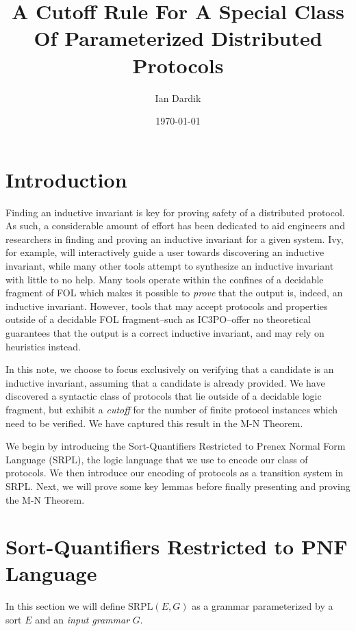 \documentclass[12pt]{article}
\title{A Cutoff Rule For A Special Class Of Parameterized Distributed Protocols}
\author{Ian Dardik}
\date{\today}
\theoremstyle{definition}
\theoremstyle{remark}
\newcommand{\SRPL}{\text{SRPL}}
\begin{document}
\maketitle

\section{Introduction}
Finding an inductive invariant is key for proving safety of a distributed protocol.  As such, a considerable amount of effort has been dedicated to aid engineers and researchers in finding and proving an inductive invariant for a given system.  Ivy, for example, will interactively guide a user towards discovering an inductive invariant, while many other tools attempt to synthesize an inductive invariant with little to no help.  Many tools operate within the confines of a decidable fragment of FOL which makes it possible to \textit{prove} that the output is, indeed, an inductive invariant.  However, tools that may accept protocols and properties outside of a decidable FOL fragment--such as IC3PO--offer no theoretical guarantees that the output is a correct inductive invariant, and may rely on heuristics instead.

In this note, we choose to focus exclusively on verifying that a candidate is an inductive invariant, assuming that a candidate is already provided.  We have discovered a syntactic class of protocols that lie outside of a decidable logic fragment, but exhibit a \textit{cutoff} for the number of finite protocol instances which need to be verified.  We have captured this result in the M-N Theorem.

We begin by introducing the Sort-Quantifiers Restricted to Prenex Normal Form Language (SRPL), the logic language that we use to encode our class of protocols.  We then introduce our encoding of protocols as a transition system in SRPL.  Next, we will prove some key lemmas before finally presenting and proving the M-N Theorem.



\section{Sort-Quantifiers Restricted to PNF Language}

In this section we will define $\SRPL(E,G)$ as a grammar parameterized by a sort $E$ and an \textit{input grammar} $G$.
\end{document}
